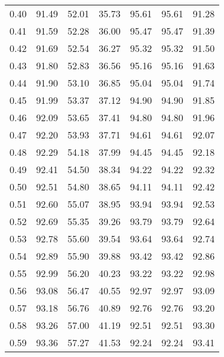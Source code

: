 \begin{tabular}{|c|c|c|c|c|c|c|}
      0.40 &     91.49 &     52.01 &      35.73 &   95.61 &      95.61 &         91.28 \\
      0.41 &     91.59 &     52.28 &      36.00 &   95.47 &      95.47 &         91.39 \\
      0.42 &     91.69 &     52.54 &      36.27 &   95.32 &      95.32 &         91.50 \\
      0.43 &     91.80 &     52.83 &      36.56 &   95.16 &      95.16 &         91.63 \\
      0.44 &     91.90 &     53.10 &      36.85 &   95.04 &      95.04 &         91.74 \\
      0.45 &     91.99 &     53.37 &      37.12 &   94.90 &      94.90 &         91.85 \\
      0.46 &     92.09 &     53.65 &      37.41 &   94.80 &      94.80 &         91.96 \\
      0.47 &     92.20 &     53.93 &      37.71 &   94.61 &      94.61 &         92.07 \\
      0.48 &     92.29 &     54.18 &      37.99 &   94.45 &      94.45 &         92.18 \\
      0.49 &     92.41 &     54.50 &      38.34 &   94.22 &      94.22 &         92.32 \\
      0.50 &     92.51 &     54.80 &      38.65 &   94.11 &      94.11 &         92.42 \\
      0.51 &     92.60 &     55.07 &      38.95 &   93.94 &      93.94 &         92.53 \\
      0.52 &     92.69 &     55.35 &      39.26 &   93.79 &      93.79 &         92.64 \\
      0.53 &     92.78 &     55.60 &      39.54 &   93.64 &      93.64 &         92.74 \\
      0.54 &     92.89 &     55.90 &      39.88 &   93.42 &      93.42 &         92.86 \\
      0.55 &     92.99 &     56.20 &      40.23 &   93.22 &      93.22 &         92.98 \\
      0.56 &     93.08 &     56.47 &      40.55 &   92.97 &      92.97 &         93.09 \\
      0.57 &     93.18 &     56.76 &      40.89 &   92.76 &      92.76 &         93.20 \\
      0.58 &     93.26 &     57.00 &      41.19 &   92.51 &      92.51 &         93.30 \\
      0.59 &     93.36 &     57.27 &      41.53 &   92.24 &      92.24 &         93.41 \\

\end{tabular}
